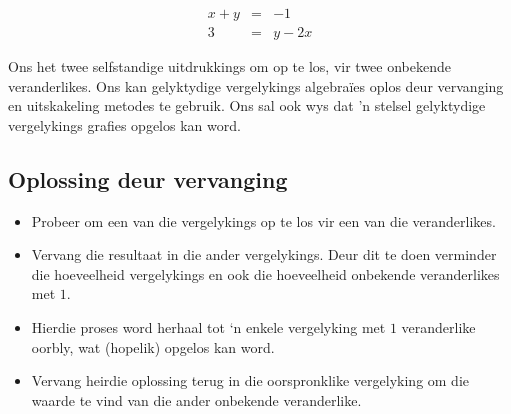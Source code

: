 \begin{equation*}
\begin{array}{rcl} x+y&=&-1 \\ 
 3&=&y-2x 
\end{array}
\end{equation*}

Ons het twee selfstandige uitdrukkings om op te los, vir twee onbekende veranderlikes. Ons kan gelyktydige vergelykings algebraïes oplos deur vervanging en uitskakeling metodes te gebruik. Ons sal ook wys dat 'n stelsel gelyktydige vergelykings grafies opgelos kan word.\par

\par 
      


\subsection*{Oplossing deur vervanging}
\begin{itemize}
 \item Probeer om een van die vergelykings op te los vir een van die veranderlikes.
\item Vervang die resultaat in die ander vergelykings. Deur dit te doen verminder die hoeveelheid
vergelykings en ook die hoeveelheid onbekende veranderlikes met $1$.
\item Hierdie proses word herhaal tot ‘n enkele vergelyking met $1$ veranderlike oorbly, wat (hopelik) opgelos kan word.
\item Vervang heirdie oplossing terug in die oorspronklike vergelyking om die waarde te vind van die ander onbekende veranderlike.
\end{itemize}

